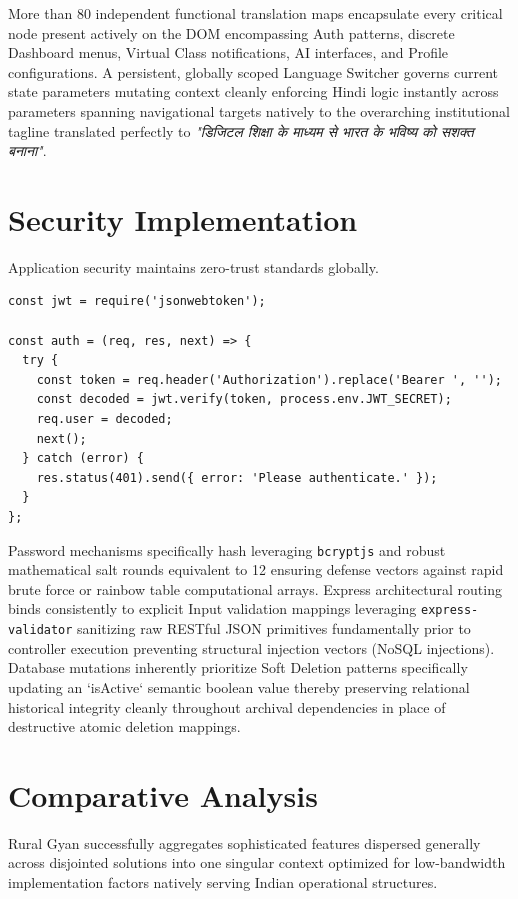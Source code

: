 \documentclass[12pt, journal, onecolumn]{IEEEtran}
\begin{document}
More than 80 independent functional translation maps encapsulate every critical node present actively on the DOM encompassing Auth patterns, discrete Dashboard menus, Virtual Class notifications, AI interfaces, and Profile configurations. A persistent, globally scoped Language Switcher governs current state parameters mutating context cleanly enforcing Hindi logic instantly across parameters spanning navigational targets natively to the overarching institutional tagline translated perfectly to \textit{"डिजिटल शिक्षा के माध्यम से भारत के भविष्य को सशक्त बनाना"}.

\section{Security Implementation}

Application security maintains zero-trust standards globally. 
\begin{lstlisting}[caption=Authorization Middleware using JWT]
const jwt = require('jsonwebtoken');

const auth = (req, res, next) => {
  try {
    const token = req.header('Authorization').replace('Bearer ', '');
    const decoded = jwt.verify(token, process.env.JWT_SECRET);
    req.user = decoded;
    next();
  } catch (error) {
    res.status(401).send({ error: 'Please authenticate.' });
  }
};
\end{lstlisting}

Password mechanisms specifically hash leveraging \texttt{bcryptjs} and robust mathematical salt rounds equivalent to 12 ensuring defense vectors against rapid brute force or rainbow table computational arrays.
Express architectural routing binds consistently to explicit Input validation mappings leveraging \texttt{express-validator} sanitizing raw RESTful JSON primitives fundamentally prior to controller execution preventing structural injection vectors (NoSQL injections).
Database mutations inherently prioritize Soft Deletion patterns specifically updating an `isActive` semantic boolean value thereby preserving relational historical integrity cleanly throughout archival dependencies in place of destructive atomic deletion mappings.

\section{Comparative Analysis}
Rural Gyan successfully aggregates sophisticated features dispersed generally across disjointed solutions into one singular context optimized for low-bandwidth implementation factors natively serving Indian operational structures. 
\end{document}
